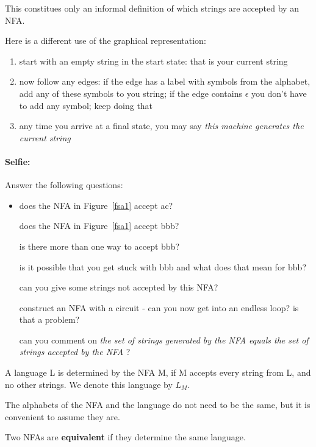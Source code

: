 This constitues only an informal definition of which strings are
accepted by an NFA.

Here is a different use of the graphical representation:

\begin{enumerate}
\item start with an empty string in the start state: that is your
  current string
\item now follow any edges: if the edge has a label with symbols from
  the alphabet, add any of these symbols to you string; if the edge
  contains $\epsilon$ you don't have to add any symbol; keep doing that
\item any time you arrive at a final state, you may say {\em this machine generates the current string}
\end{enumerate}



\paragraph{Selfie:} Answer the following questions:

\begin{itemize}
\item[]
does the NFA in Figure~\ref{fsa1} accept ac?

does the NFA in Figure~\ref{fsa1} accept bbb?

is there more than one way to accept bbb?

is it possible that you get stuck with bbb and what does that mean for bbb?

can you give some strings not accepted by this NFA?

construct an NFA with a circuit - can you now get into an endless
loop? is that a problem?

can you comment on {\em the set of strings generated by the NFA equals
  the set of strings accepted by the NFA} ?
\end{itemize}

\begin{definition}
A language L is determined by the NFA M, if M accepts every string
from L, and no other strings. We denote this language by $L_M$.
\end{definition}

The alphabets of the NFA and the language do not need to be the same,
but it is convenient to assume they are.

\begin{definition}
Two NFAs are {\bf equivalent} if they determine the same language.
\end{definition}

